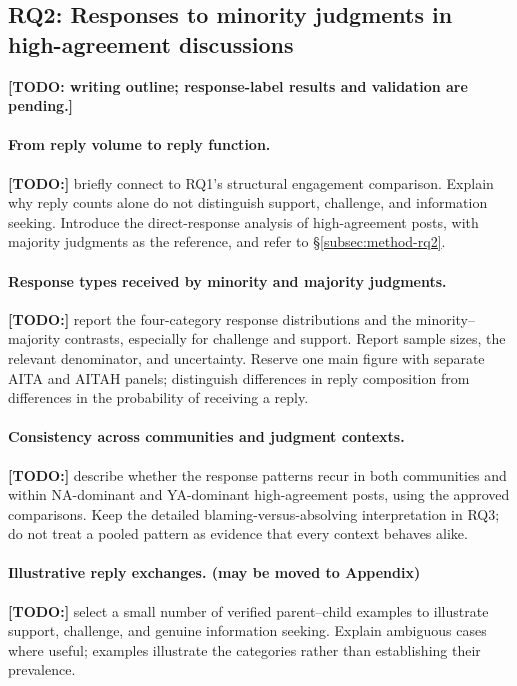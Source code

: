 \subsection{RQ2: Responses to minority judgments in high-agreement discussions}
\label{subsec:res-rq2}

\textbf{[TODO: writing outline; response-label results and validation are
pending.]}

\paragraph{From reply volume to reply function.}
\textbf{[TODO:]} briefly connect to RQ1's structural engagement comparison.
Explain why reply counts alone do not distinguish support, challenge, and
information seeking. Introduce the direct-response analysis of high-agreement
posts, with majority judgments as the reference, and refer to
\S\ref{subsec:method-rq2}.

\paragraph{Response types received by minority and majority judgments.}
\textbf{[TODO:]} report the four-category response distributions and the
minority--majority contrasts, especially for challenge and support. Report
sample sizes, the relevant denominator, and uncertainty. Reserve one main
figure with separate AITA and AITAH panels; distinguish differences in reply
composition from differences in the probability of receiving a reply.

\paragraph{Consistency across communities and judgment contexts.}
\textbf{[TODO:]} describe whether the response patterns recur in both communities
and within NA-dominant and YA-dominant high-agreement posts, using the approved
comparisons. Keep the detailed blaming-versus-absolving interpretation in RQ3;
do not treat a pooled pattern as evidence that every context behaves alike.

\paragraph{Illustrative reply exchanges. (may be moved to Appendix)}
\textbf{[TODO:]} select a small number of verified parent--child examples to
illustrate support, challenge, and genuine information seeking. Explain
ambiguous cases where useful; examples illustrate the categories rather than
establishing their prevalence.

